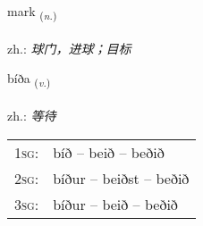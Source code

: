 \documentclass[frontgrid, backgrid]{flacards}\usepackage[]{graphicx}\usepackage[]{xcolor}
\begin{document}
\renewcommand{\flhead}{\vskip5pt \fboxsep=0pt {\small\bfseries\footnotesize Nafnorð | 名词}}
\renewcommand{\fcfoot}{\vskip5pt \fboxsep=0pt \hspace{2pt}{\small\bfseries\footnotesize 1K}}

\renewcommand{\blhead}{\vskip5pt {\small\bfseries\footnotesize Nafnorð | 名词 }}
\renewcommand{\bcfoot}{\vskip5pt \hspace{2pt}{\small\bfseries\footnotesize 1K}}


{mark \small{\textsubscript{(\textit{n.})}} \\[1ex] %
\textphonetic{[mar̥k]} \\
zh.: \emph{球门，进球；目标} \\  [2ex]
\renewcommand*{\arraystretch}{0.8}
}

\renewcommand{\flhead}{\vskip5pt \fboxsep=0pt {\small\bfseries\footnotesize Sagnorð | 动词}}
\renewcommand{\fcfoot}{\vskip5pt \fboxsep=0pt \hspace{2pt}{\small\bfseries\footnotesize 1K}}

\renewcommand{\blhead}{\vskip5pt {\small\bfseries\footnotesize Sagnorð | 动词 }}
\renewcommand{\bcfoot}{\vskip5pt \hspace{2pt}{\small\bfseries\footnotesize 1K}}


{bíða \small{\textsubscript{(\textit{v.})}} \\[1ex] %
\textphonetic{[piːða]} \\
zh.: \emph{等待} \\  [2ex]
\renewcommand*{\arraystretch}{0.8}
\begin{tabular}{p{1cm}l}
\textsc{1sg}: & bíð -- beið -- beðið \\ 
\textsc{2sg}: & bíður -- beiðst -- beðið \\ 
\textsc{3sg}: & bíður -- beið -- beðið \\ 
\end{tabular}
}
\end{document}
